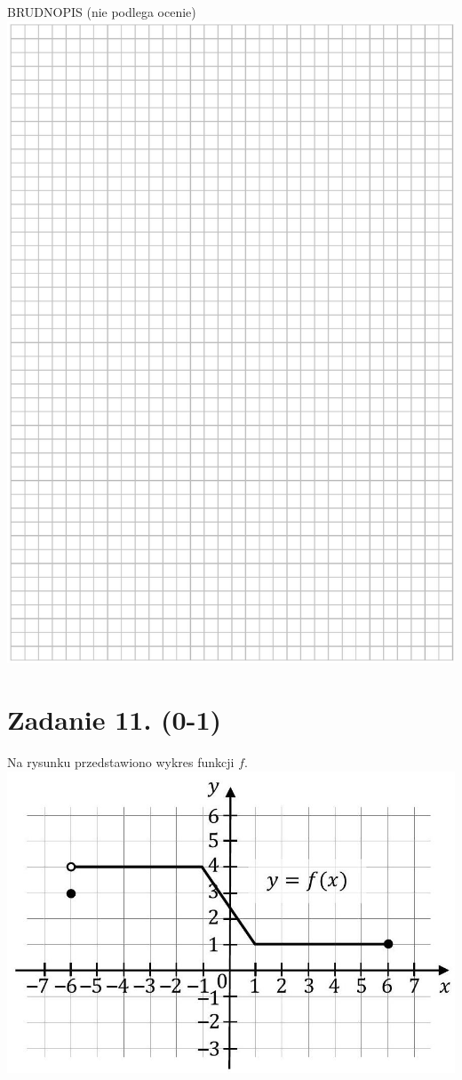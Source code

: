 \documentclass[10pt]{article}
\begin{document}
BRUDNOPIS (nie podlega ocenie)\\
\includegraphics[max width=\textwidth, center]{2024_11_21_0a35d272448d5080a489g-09}

\section*{Zadanie 11. (0-1)}
Na rysunku przedstawiono wykres funkcji \(f\).\\
\includegraphics[max width=\textwidth, center]{2024_11_21_0a35d272448d5080a489g-10}
\end{document}
